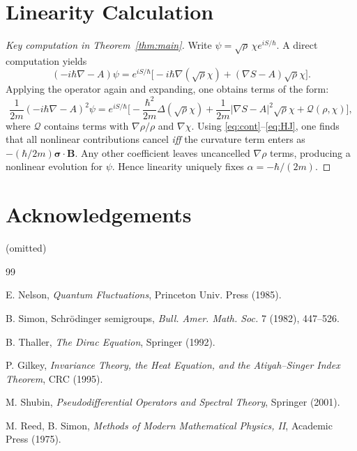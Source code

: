 \documentclass[11pt]{article}
\begin{document}
\section{Linearity Calculation}\label{app:linearity}

\begin{proof}[Key computation in Theorem~\ref{thm:main}]
Write $\psi=\sqrt{\rho}\,\chi e^{iS/\hbar}$. A direct computation yields
\[
(-i\hbar\nabla - A)\psi
=
e^{iS/\hbar}\Big[-i\hbar\nabla(\sqrt{\rho}\chi) + (\nabla S - A)\sqrt{\rho}\chi\Big].
\]
Applying the operator again and expanding, one obtains terms of the form:
\[
\frac{1}{2m}(-i\hbar\nabla - A)^2\psi
=
e^{iS/\hbar}\Big[
-\frac{\hbar^2}{2m}\Delta(\sqrt{\rho}\chi)
+\frac{1}{2m}|\nabla S - A|^2\sqrt{\rho}\chi
+\mathcal{Q}(\rho,\chi)
\Big],
\]
where $\mathcal{Q}$ contains terms with $\nabla \rho/\rho$ and $\nabla\chi$. Using \eqref{eq:cont}--\eqref{eq:HJ}, one finds that all nonlinear contributions cancel \emph{iff} the curvature term enters as $-(\hbar/2m)\bm{\sigma}\cdot\bm{B}$. Any other coefficient leaves uncancelled $\nabla\rho$ terms, producing a nonlinear evolution for $\psi$. Hence linearity uniquely fixes $\alpha=-\hbar/(2m)$.
\end{proof}

\section*{Acknowledgements}

(omitted)

\begin{thebibliography}{99}

E. Nelson, \emph{Quantum Fluctuations}, Princeton Univ. Press (1985).

B. Simon, Schr\"odinger semigroups, \emph{Bull. Amer. Math. Soc.} 7 (1982), 447--526.

B. Thaller, \emph{The Dirac Equation}, Springer (1992).

P. Gilkey, \emph{Invariance Theory, the Heat Equation, and the Atiyah--Singer Index Theorem}, CRC (1995).

M. Shubin, \emph{Pseudodifferential Operators and Spectral Theory}, Springer (2001).

M. Reed, B. Simon, \emph{Methods of Modern Mathematical Physics, II}, Academic Press (1975).

\end{thebibliography}
\end{document}
